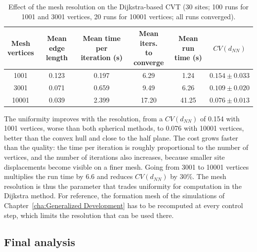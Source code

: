 \begin{table}[htbp]
\centering
\caption[Effect of the mesh resolution on the Dijkstra-based CVT]{Effect of the mesh resolution on the Dijkstra-based \gls{CVT} (30 sites; 100 runs for 1001 and 3001 vertices, 20 runs for 10001 vertices; all runs converged).}
\label{tab.annex:cvt_mesh_resolution}
\begin{tabular}{cccccc}
\toprule
\makecell{Mesh\\vertices} & \makecell{Mean edge\\length} & \makecell{Mean time per\\iteration (s)} & \makecell{Mean iters.\\to converge} & \makecell{Mean run\\time (s)} & $CV(d_{NN})$ \\
\midrule
1001  & 0.123 & 0.197 & 6.29  & 1.24  & $0.154 \pm 0.033$ \\
3001  & 0.071 & 0.659 & 9.49  & 6.26  & $0.109 \pm 0.020$ \\
10001 & 0.039 & 2.399 & 17.20 & 41.25 & $0.076 \pm 0.013$ \\
\bottomrule
\end{tabular}
\end{table}

The uniformity improves with the resolution, from a $CV(d_{NN})$ of 0.154 with 1001 vertices, worse than both spherical methods, to 0.076 with 10001 vertices, better than the convex hull and close to the half plane. The cost grows faster than the quality: the time per iteration is roughly proportional to the number of vertices, and the number of iterations also increases, because smaller site displacements become visible on a finer mesh. Going from 3001 to 10001 vertices multiplies the run time by 6.6 and reduces $CV(d_{NN})$ by 30\%. The mesh resolution is thus the parameter that trades uniformity for computation in the Dijkstra method. For reference, the formation mesh of the simulations of Chapter~\ref{cha:Generalized Development} has to be recomputed at every control step, which limits the resolution that can be used there.

\subsection{Final analysis}


